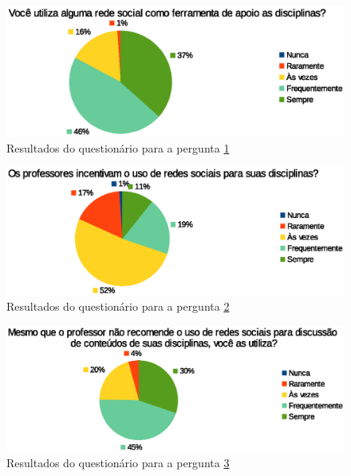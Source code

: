 \begin{apendicesenv}
\begin{figure}[h]
    \centering
    \includegraphics[keepaspectratio=true,scale=1]
      {figuras/pergunta2p.eps}
    \caption{Resultados do questionário para a pergunta \ref{pergunta2}}
    \label{pergunta2}
\end{figure}

\begin{figure}[h]
    \centering
    \includegraphics[keepaspectratio=true,scale=1]
      {figuras/pergunta3p.eps}
    \caption{Resultados do questionário para a pergunta \ref{pergunta3}}
    \label{pergunta3}
\end{figure}

\begin{figure}[h]
    \centering
    \includegraphics[keepaspectratio=true,scale=1]
      {figuras/pergunta4p.eps}
    \caption{Resultados do questionário para a pergunta \ref{pergunta4}}
    \label{pergunta4}
\end{figure}

\end{apendicesenv}